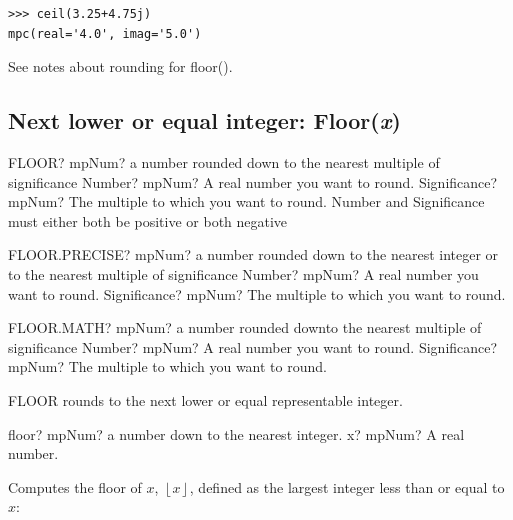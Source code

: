 \begin{lstlisting}
>>> ceil(3.25+4.75j)
mpc(real='4.0', imag='5.0')
\end{lstlisting}

See notes about rounding for floor().



\subsection{Next lower or equal integer: Floor(\textit{x})}


\begin{mpFunctionsExtract}
	\mpWorksheetFunctionTwoNotImplemented
	{FLOOR? mpNum? a number rounded down to the nearest multiple of significance}
	{Number? mpNum? A real number you want to round.}
	{Significance? mpNum? The multiple to which you want to round. Number and Significance must either both be positive or both negative}
\end{mpFunctionsExtract}


\vspace{0.6cm}
\begin{mpFunctionsExtract}
	\mpWorksheetFunctionTwoNotImplemented
	{FLOOR.PRECISE? mpNum? a number rounded down to the nearest integer or to the nearest multiple of significance}
	{Number? mpNum? A real number you want to round.}
	{Significance? mpNum? The multiple to which you want to round.}
\end{mpFunctionsExtract}


\vspace{0.6cm}
\begin{mpFunctionsExtract}
	\mpWorksheetFunctionTwoNotImplemented
	{FLOOR.MATH? mpNum? a number rounded downto the nearest multiple of significance}
	{Number? mpNum? A real number you want to round.}
	{Significance? mpNum? The multiple to which you want to round.}
\end{mpFunctionsExtract}

\vspace{0.3cm}

FLOOR rounds to the next lower or equal representable integer.



\begin{mpFunctionsExtract}
	\mpFunctionOne
	{floor? mpNum?  a number down to the nearest integer.}
	{x? mpNum? A real number.}
\end{mpFunctionsExtract}


\vpara
Computes the floor of $x$, $\left\lfloor x \right\rfloor$, defined as the largest integer less than or equal to $x$:

